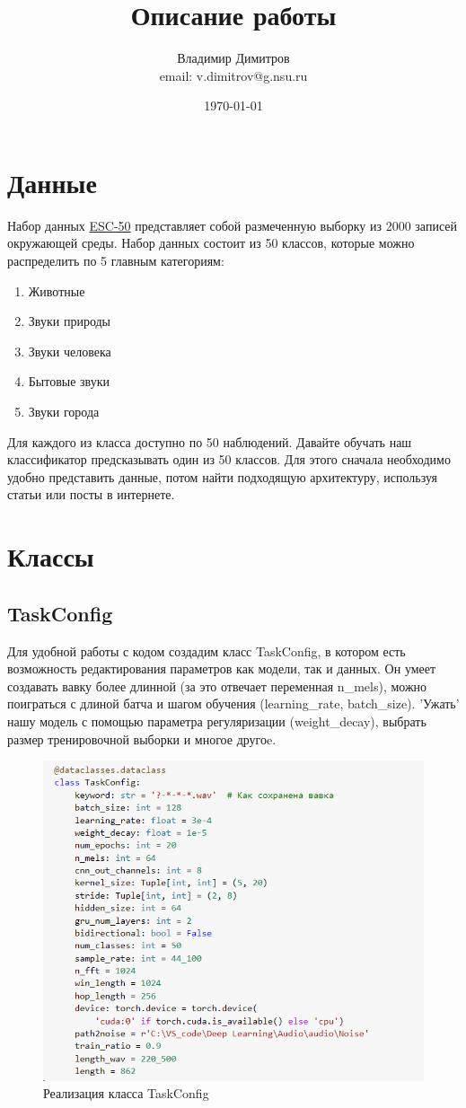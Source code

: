 \documentclass[a4paper,12pt]{article}
\author{Владимир Димитров \\ email: v.dimitrov@g.nsu.ru}
\title{Описание работы}
\date{\today}
\begin{document}
	\maketitle
	\newpage
	\tableofcontents
	\newpage
	\section{Данные}
	Набор данных \href{https://github.com/karolpiczak/ESC-50}{ESC-50} представляет собой размеченную выборку из 2000 записей окружающей среды. Набор данных состоит из 50 классов, которые можно распределить по 5 главным категориям:
	\begin{enumerate}
		\item Животные
		\item Звуки природы
		\item Звуки человека
		\item Бытовые звуки
		\item Звуки города
	\end{enumerate}
	Для каждого из класса доступно по 50 наблюдений. Давайте обучать наш классификатор предсказывать один из 50 классов. Для этого сначала необходимо удобно представить данные, потом найти подходящую архитектуру, используя статьи или посты в интернете.
	
	\section{Классы}
	
	\subsection{TaskConfig}
	Для удобной работы с кодом создадим класс TaskConfig, в котором есть возможность  редактирования параметров как модели, так и данных. Он умеет создавать вавку более длинной (за это отвечает переменная n\_mels), можно поиграться с длиной батча и шагом обучения (learning\_rate, batch\_size). 'Ужать' нашу модель с помощью параметра регуляризации (weight\_decay), выбрать размер тренировочной выборки и многое другоe.
\begin{figure}[H]
	\centering
	\includegraphics[width=0.9\linewidth]{Image/Taskconfig}
	\caption{Реализация класса TaskConfig}
	\label{fig:taskconfig}
\end{figure}
	
\end{document}
